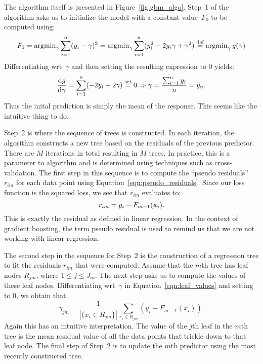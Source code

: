 The algorithm itself is presented in Figure~\ref{fig:gbm_algo}. Step~1 of the 
algorithm asks us to initialize the model with a constant value~$F_0$ 
to be computed using:
\begin{equation}
        F_0 
        = \operatorname{argmin}_{\gamma} \sum_{i = 1}^{n} (y_i - \gamma)^2
        = \operatorname{argmin}_{\gamma} \sum_{i = 1}^{n} (y_i^2 - 2 y_i \gamma + \gamma^2)
        \stackrel{\text{def}}{=} \operatorname{argmin}_{\gamma} g(\gamma)
\end{equation}
Differentiating wrt~$\gamma$ and then setting the resulting expression to $0$
yields:
\[
    \frac{\mathrm{d} g}{\mathrm{d} \gamma} = \sum_{i = 1}^{n} (-2 y_i + 2 \gamma) \stackrel{\text{set}}{=} 0
    \Rightarrow \gamma = \frac{\sum_{i = 1}^{n} y_i}{n} = \bar{y}_n.
\]
Thus the inital prediction is simply the mean of the response. This seems 
like the intuitive thing to do. 

Step~2 is where the sequence of trees is constructed. In each iteration, 
the algorithm constructs a new tree based on the residuals of the previous 
predictor. There are $M$ iterations in total resulting in $M$ trees. 
In practice, this is a parameter to algorithm and is determined using techniques 
such as cross-validation. The first step in this sequence is to compute the 
``pseudo residuals'' $r_{i m}$ for each data point using 
Equation~\ref{eqn:pseudo_residuals}. Since our loss function 
is the squared loss, we see that $r_{im}$ evaluates to: 
\[
    r_{i m} = y_i - F_{m - 1}(\mathbf{x}_i).
\] 
This is exactly the residual as defined in linear regression. In the context 
of gradient boosting, the term pseudo residual is used to remind us that we 
are not working with linear regression.

The second step in the sequence for Step~2 is the construction of a regression 
tree to fit the residuals $r_{i m}$ that were computed. Assume that the $m$th 
tree has leaf nodes $R_{j m}$, where $1 \leq j \leq J_m$. The next step asks 
us to compute the values of these leaf nodes. Differentiating wrt~$\gamma$ 
in Equation~\ref{eqn:leaf_values} and setting to $0$, we obtain that
\begin{equation}
    \gamma_{j m} 
        = \frac{1}{| \{ x_i \in R_{j m} \} |} \sum_{x_i \in R_{j m}} (y_i - F_{m - 1}(x_i)).
\end{equation}
Again this has an intuitive interpretation. The value of the $j$th leaf in the 
$m$th tree is the mean residual value of all the data points that trickle down
to that leaf node. The final step of Step~2 is to update the $m$th predictor 
using the most recently constructed tree.  

